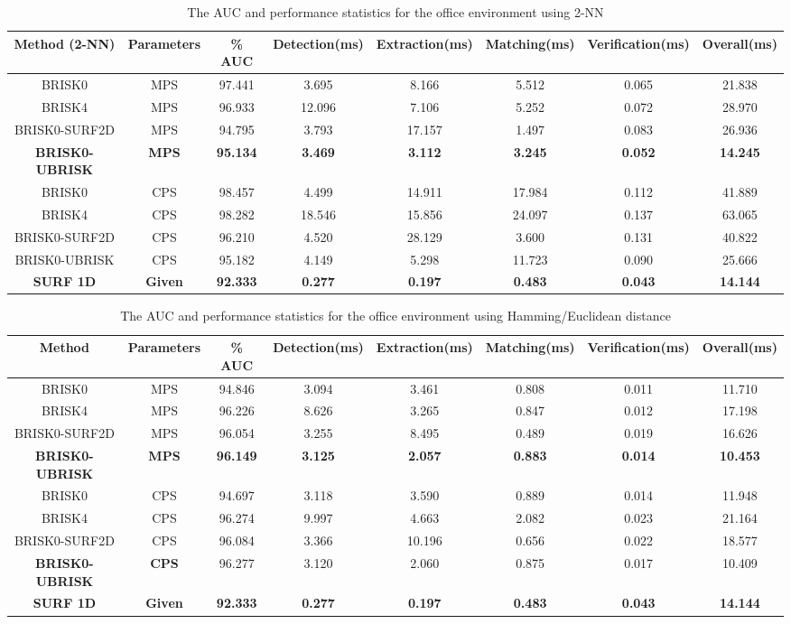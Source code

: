 \documentclass{report}
\begin{document}
\begin{table}
\caption{The AUC and performance statistics for the office environment using
2-NN}
\tiny
\begin{tabular}{|c|c|c|c|c|c|c|c|}
\hline 
\textbf{Method (2-NN)} & \textbf{Parameters} & \textbf{\% AUC} & \textbf{Detection(ms)} & \textbf{Extraction(ms)} & \textbf{Matching(ms)} & \textbf{Verification(ms)} & \textbf{Overall(ms)}\tabularnewline
\hline 
\hline 
BRISK0 & MPS & 97.441 & 3.695 & 8.166 & 5.512 & 0.065 & 21.838\tabularnewline
\hline 
BRISK4 & MPS & 96.933 & 12.096 & 7.106 & 5.252 & 0.072 & 28.970\tabularnewline
\hline 
BRISK0-SURF2D & MPS & 94.795 & 3.793 & 17.157 & 1.497 & 0.083 & 26.936\tabularnewline
\hline 
\textbf{BRISK0-UBRISK} & \textbf{MPS} & \textbf{95.134} & \textbf{3.469} & \textbf{3.112} & \textbf{3.245} & \textbf{0.052} & \textbf{14.245}\tabularnewline
\hline 
BRISK0 & CPS & 98.457 & 4.499 & 14.911 & 17.984 & 0.112 & 41.889\tabularnewline
\hline 
BRISK4 & CPS & 98.282 & 18.546 & 15.856 & 24.097 & 0.137 & 63.065\tabularnewline
\hline 
BRISK0-SURF2D & CPS & 96.210 & 4.520 & 28.129 & 3.600 & 0.131 & 40.822\tabularnewline
\hline 
BRISK0-UBRISK & CPS & 95.182 & 4.149 & 5.298 & 11.723 & 0.090 & 25.666\tabularnewline
\hline 
\textbf{SURF 1D} & \textbf{Given} & \textbf{92.333} & \textbf{0.277} & \textbf{0.197} & \textbf{0.483} & \textbf{0.043} & \textbf{14.144}\tabularnewline
\hline 
\end{tabular}
\label{tab:rocTimingOfficeKnn}
\end{table}

\begin{table}
\caption{The AUC and performance statistics for the office environment using
Hamming/Euclidean distance}
\tiny
\begin{tabular}{|c|c|c|c|c|c|c|c|}
\hline 
\textbf{Method} & \textbf{Parameters} & \textbf{\% AUC} & \textbf{Detection(ms)} & \textbf{Extraction(ms)} & \textbf{Matching(ms)} & \textbf{Verification(ms)} & \textbf{Overall(ms)}\tabularnewline
\hline 
\hline 
BRISK0 & MPS & 94.846 & 3.094 & 3.461 & 0.808 & 0.011 & 11.710\tabularnewline
\hline 
BRISK4 & MPS & 96.226 & 8.626 & 3.265 & 0.847 & 0.012 & 17.198\tabularnewline
\hline 
BRISK0-SURF2D & MPS & 96.054 & 3.255 & 8.495 & 0.489 & 0.019 & 16.626\tabularnewline
\hline 
\textbf{BRISK0-UBRISK} & \textbf{MPS} & \textbf{96.149} & \textbf{3.125} & \textbf{2.057} & \textbf{0.883} & \textbf{0.014} & \textbf{10.453}\tabularnewline
\hline 
BRISK0 & CPS & 94.697 & 3.118 & 3.590 & 0.889 & 0.014 & 11.948\tabularnewline
\hline 
BRISK4 & CPS & 96.274 & 9.997 & 4.663 & 2.082 & 0.023 & 21.164\tabularnewline
\hline 
BRISK0-SURF2D & CPS & 96.084 & 3.366 & 10.196 & 0.656 & 0.022 & 18.577\tabularnewline
\hline 
\textbf{BRISK0-UBRISK} & \textbf{CPS} & 96.277 & 3.120 & 2.060 & 0.875 & 0.017 & 10.409\tabularnewline
\hline 
\textbf{SURF 1D} & \textbf{Given} & \textbf{92.333} & \textbf{0.277} & \textbf{0.197} & \textbf{0.483} & \textbf{0.043} & \textbf{14.144}\tabularnewline
\hline 
\end{tabular}
\label{tab:rocTimingOfficeHamming}
\end{table}
\end{document}
